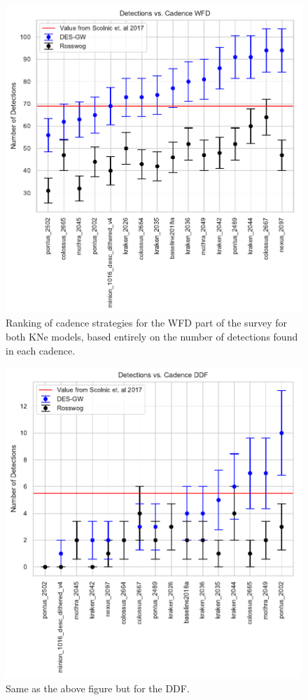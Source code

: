 \begin{figure}[h!]
  \centering
  \includegraphics[scale=0.7]{figures/wfd_detection_counts_by_cadence}
  \caption{Ranking of cadence strategies for the WFD part of the survey for both KNe models, based entirely on the number of detections found in each cadence.}
  \label{fig:cadence_ranking}
\end{figure}

\begin{figure}[h!]
  \centering
  \includegraphics[scale=0.7]{figures/ddf_detection_counts_by_cadence}
  \caption{Same as the above figure but for the DDF.}
  \label{fig:cadence_ranking_ddf}
\end{figure}

\FloatBarrier
